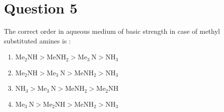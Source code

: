 \documentclass{article}
\begin{document}
\section*{Question 5}
The correct order in aqueous medium of basic strength in case of methyl substituted amines is : 
\begin{enumerate}[label=(\alph*)]
\item \(\mathrm{Me}_2 \mathrm{NH}>\mathrm{MeNH}_2>\mathrm{Me}_3 \mathrm{~N}>\mathrm{NH}_3\)
\item \(\mathrm{Me}_2 \mathrm{NH}>\mathrm{Me}_3 \mathrm{~N}>\mathrm{MeNH}_2>\mathrm{NH}_3\)
\item \(\mathrm{NH}_3>\mathrm{Me}_3 \mathrm{~N}>\mathrm{MeNH}_2>\mathrm{Me}_2 \mathrm{NH}\)
\item \(\mathrm{Me}_3 \mathrm{~N}>\mathrm{Me}_2 \mathrm{NH}>\mathrm{MeNH}_2>\mathrm{NH}_3\)
\end{enumerate}
\newpage
\end{document}

